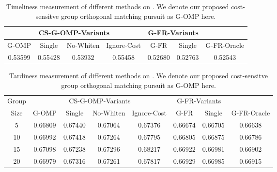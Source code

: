 \begin{table}[b]
\caption{Timeliness measurement of different methods on \GrainDataset. We denote 
our proposed cost-sensitve group orthogonal matching pursuit as G-OMP here. }
\label{tab:grain_auc} 
\begin{center}
\begin{tabular}{|c|c|c|c|c|c|c|}
\hline
\multicolumn{4}{|c|}{CS-G-OMP-Variants} &
\multicolumn{2}{c|}{G-FR-Variants} &
\; \\
\hline
	G-OMP & 
	Single & 
	No-Whiten & 
	Ignore-Cost & 
	G-FR 		& 
	Single &
	G-FR-Oracle \\
	\hline
	0.53599 & %
	0.55428 &%
	0.53932 &%
	0.55458 &%
	0.52680 &%
	0.52763 &%
	0.52543 \\ %
	\hline
\end{tabular}
\end{center}
\end{table}

\begin{table}[b]
\caption{Tardiness measurement of different methods on \YahooDataset. We denote 
our proposed cost-sensitve group orthogonal matching pursuit as G-OMP here. }
\label{tab:yahoo_auc} 
\begin{center}
\begin{tabular}{|c|c|c|c|c|c|c|c|}
\hline
Group &
\multicolumn{4}{c|}{CS-G-OMP-Variants} &
\multicolumn{2}{c|}{G-FR-Variants} &
\; \\
\cline{2-8}
	Size &
	G-OMP & 
	Single & 
	No-Whiten & 
	Ignore-Cost & 
	G-FR 		& 
	Single &
	G-FR-Oracle \\
	\hline
	5       & %
	0.66809 & %
	0.67440 &%
	0.67064 &%
	0.67376 &%
	0.66674 &%
	0.66705 &%
	0.66638 \\ %
\hline
	10      & %
	0.66992 & %
	0.67418 &%
	0.67264 &%
	0.67795 &%
	0.66805 &%
	0.66875 &%
	0.66786 \\ %
\hline
	15      & %
	0.67098 & %
	0.67238 &%
	0.67296 &%
	0.68217 &%
	0.66922 &%
	0.66981 &%
	0.66902 \\ %
\hline
	20      & %
	0.66979 & %
	0.67316 &%
	0.67261 &%
	0.67817 &%
	0.66929 &%
	0.66985 &%
	0.66915 \\ %
	\hline
\end{tabular}
\end{center}
\end{table}
